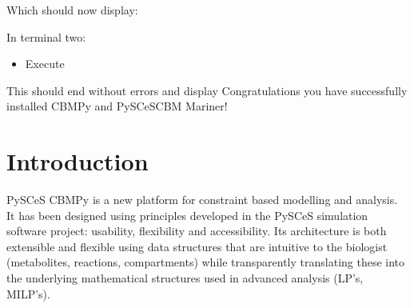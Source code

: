 \documentclass[letterpaper,10pt,english]{sphinxmanual}
\begin{document}
\sphinxAtStartPar
Which should now display:

\begin{sphinxVerbatim}[commandchars=\\\{\}]
\PYGZbs{}\PYGZbs{}\PYGZbs{}\PYGZbs{}\PYGZbs{}\PYGZbs{} 
  \PYGZbs{}\PYGZbs{}\PYGZbs{}\PYGZbs{}\PYGZbs{}\PYGZbs{}    
   
   

        


    \PYG{p}{[}\PYG{p}{]}

       
\end{sphinxVerbatim}

\sphinxAtStartPar
In terminal two:
\begin{itemize}
\item {} 
\sphinxAtStartPar
Execute 

\end{itemize}

\sphinxAtStartPar
This should end without errors and display  Congratulations
you have successfully installed CBMPy and PySCeS\sphinxhyphen{}CBM Mariner!

\sphinxstepscope


\chapter{Introduction}
\label{\detokenize{manual_doc:introduction}}\label{\detokenize{manual_doc:introducing-cbmpy}}\label{\detokenize{manual_doc::doc}}
\sphinxAtStartPar
PySCeS CBMPy is a new platform for constraint based modelling and analysis. It has been designed using principles
developed in the PySCeS simulation software project: usability, flexibility and accessibility. Its architecture
is both extensible and flexible using data structures that are intuitive to the biologist (metabolites, reactions, compartments)
while transparently translating these into the underlying mathematical structures used in advanced analysis (LP’s, MILP’s).
\end{document}
